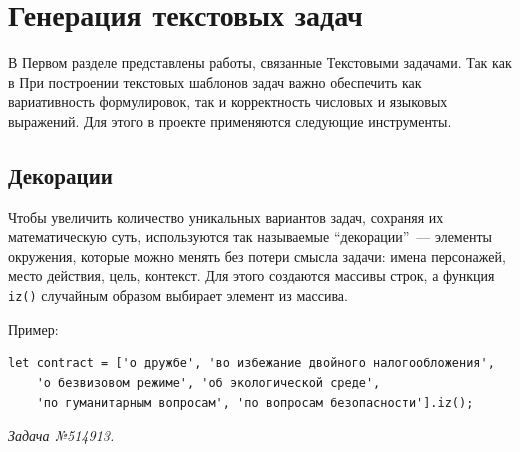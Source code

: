 \section{Генерация текстовых задач}

В Первом разделе представлены работы, связанные Текстовыми задачами. 
Так как в 
При построении текстовых шаблонов задач важно обеспечить как вариативность формулировок, так и корректность числовых и языковых выражений. Для этого в проекте применяются следующие инструменты.

\subsection{Декорации}

Чтобы увеличить количество уникальных вариантов задач, сохраняя их математическую суть, используются так называемые ``декорации''~— элементы окружения, которые можно менять без потери смысла задачи: имена персонажей, место действия, цель, контекст. 
Для этого создаются массивы строк, а функция \texttt{iz()} случайным образом выбирает элемент из массива.

Пример:
\begin{lstlisting}
let contract = ['о дружбе', 'во избежание двойного налогообложения',
    'о безвизовом режиме', 'об экологической среде',
    'по гуманитарным вопросам', 'по вопросам безопасности'].iz();
\end{lstlisting}
\textsl{Задача №514913.}
 

